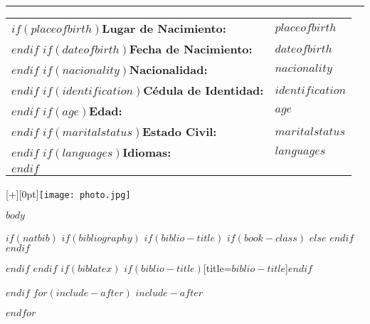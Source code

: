 \vspace{2 mm}

\hrule

\begin{minipage}[t]{0.65\textwidth}
  \begin{tabular}{@{}ll@{}}
    $if(placeofbirth)$\textbf{Lugar de Nacimiento:} & $placeofbirth$ \\$endif$
    $if(dateofbirth)$\textbf{Fecha de Nacimiento:} & $dateofbirth$ \\$endif$
    $if(nacionality)$\textbf{Nacionalidad:} & $nacionality$ \\$endif$
    $if(identification)$\textbf{Cédula de Identidad:} & $identification$ \\$endif$
    $if(age)$\textbf{Edad:} & $age$ \\$endif$
    $if(maritalstatus)$\textbf{Estado Civil:} & $maritalstatus$ \\$endif$
    $if(languages)$\textbf{Idiomas:} & $languages$ \\$endif$
  \end{tabular}
\end{minipage}
\hfill
\begin{minipage}[t]{0.30\textwidth}
  \centering
  \vspace{0pt}
  \raisebox{-40pt}[\dimexpr\ht\strutbox+\dp\strutbox][0pt]{\texttt{[image: photo.jpg]}}
\end{minipage}

$body$

$if(natbib)$
$if(bibliography)$
$if(biblio-title)$
$if(book-class)$
\renewcommand\bibname{$biblio-title$}
$else$
\renewcommand\refname{$biblio-title$}
$endif$
$endif$


$endif$
$endif$
$if(biblatex)$
\printbibliography$if(biblio-title)$[title=$biblio-title$]$endif$

$endif$
$for(include-after)$
$include-after$

$endfor$


